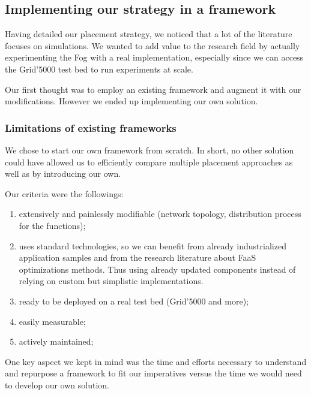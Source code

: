 
\subsection{Implementing our strategy in a framework}


Having detailed our placement strategy, we noticed that a lot of the literature focuses on simulations. We wanted to add value to the research field by actually experimenting the Fog with a real implementation, especially since we can access the Grid'5000 test bed \cite{noauthor_getting_nodate} to run experiments at scale.

Our first thought was to employ an existing framework and augment it with our modifications. However we ended up implementing our own solution.

\subsubsection{Limitations of existing frameworks}

We chose to start our own framework from scratch. In short, no other solution could have allowed us to efficiently compare multiple placement approaches as well as by introducing our own.

Our criteria were the followings:
\begin{enumerate}[(1)]
	\item extensively and painlessly modifiable (network topology, distribution process for the functions);
	\item uses standard technologies, so we can benefit from already industrialized application samples and from the research literature about \gls{FaaS} optimizations methods. Thus using already updated components instead of relying on custom but simplistic implementations.
	\item ready to be deployed on a real test bed (Grid'5000 and more);
	\item easily measurable;
	\item actively maintained;
\end{enumerate}

One key aspect we kept in mind was the time and efforts necessary to understand and repurpose a framework to fit our imperatives versus the time we would need to develop our own solution.

